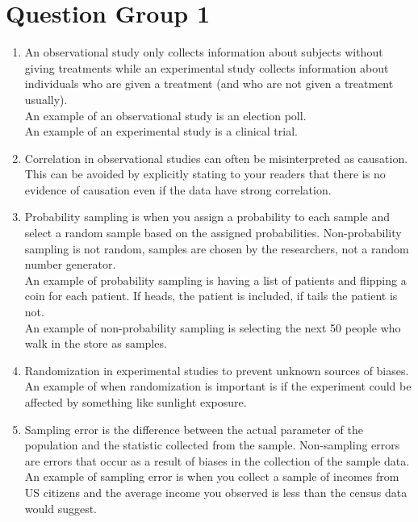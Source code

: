 \documentclass{article}
\title{\thetitle}
\author{\theauthor}
\begin{document}
\maketitle

\section*{Question Group 1}
\begin{enumerate}
\item An observational study only collects information about subjects without giving treatments while an experimental study collects information about individuals who are given a treatment (and who are not given a treatment usually). \\
An example of an observational study is an election poll. \\
An example of an experimental study is a clinical trial. \\
\item Correlation in observational studies can often be misinterpreted as causation. This can be avoided by explicitly stating to your readers that there is no evidence of causation even if the data have strong correlation. \\
\item Probability sampling is when you assign a probability to each sample and select a random sample based on the assigned probabilities. Non-probability sampling is not random, samples are chosen by the researchers, not a random number generator. \\
An example of probability sampling is having a list of patients and flipping a coin for each patient. If heads, the patient is included, if tails the patient is not. \\
An example of non-probability sampling is selecting the next 50 people who walk in the store as samples. \\
\item Randomization in experimental studies to prevent unknown sources of biases. An example of when randomization is important is if the experiment could be affected by something like sunlight exposure. \\
\item Sampling error is the difference between the actual parameter of the population and the statistic collected from the sample. Non-sampling errors are errors that occur as a result of biases in the collection of the sample data. \\
An example of sampling error is when you collect a sample of incomes from US citizens and the average income you observed is less than the census data would suggest. \\

\end{enumerate}
\end{document}
